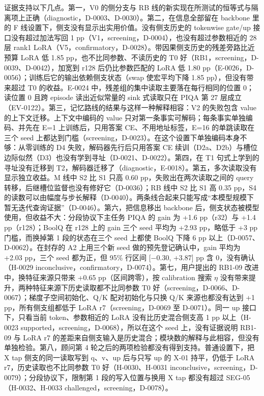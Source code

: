 \documentclass[11pt]{article}
\begin{document}
证据支持以下几点。第一，V0 的侧分支与 RB 线的新实现在所测试的恒等式与隔离项上正确（diagnostic，D-0003、D-0030）。第二，在信息全部留在 backbone 里的 F 线设置下，侧支没有显示出实用价值。没有侧支历史的 tokenwise gate/up 接口没有超过加法写回 1 pp（V1，screening，D-0004），也没有超过参数相近的 28 层 rank1 LoRA（V5，confirmatory，D-0028）。带因果侧支历史的残差旁路比近预算 LoRA 低 1.85 pp，也不比同参数、不读历史的 T0 好（RB1，screening，D-0039、D-0042），加宽到 r128 后仍比参数匹配的 LoRA 低 1.80 pp（E-0026，D-0056）；训练后它的输出依赖侧支状态（swap 使宏平均下降 1.85 pp），但没有带来超过 T0 的收益。E-0024 中，残差组的集中读取主要落在每行相同的位置 0；读位置 0 且跨 episode 读出近似常量的 sink 式读取只在 PIQA 第 27 层成立（EV-0122）。第三，记忆路线的结果与这样一种解释相容：V2 的失败包含 value 的上下文迁移。上下文中编码的 value 只对第一条事实可解码；每条事实单独编码、并先在 E=1 上训练后，只用答案 CE、不用地址标签，E=16 的单跳读取在三个 seed 上都达到门槛（screening，D-0023）。在这个设置下单独编码本身不够：从零训练的 D4 失败，解码器先行后只用答案 CE 续训（D2a、D2b）与槽位边际似然（D3）也没有学到寻址（D-0021、D-0022）。第四，在 T1 句式上学到的寻址没有迁移到 T2，解码器迁移了（diagnostic，E-0018）。第五，多次读取没有显示独立收益。M 线中 S2 比 S1 只高 0.60 pp，失败出在两次读取之间的 query 转移，后继槽位监督也没有修好它（D-0036）；RB 线中 S2 比 S1 高 0.35 pp，S4 的读数可以由幅度与步长解释（D-0040）。两条线合起来只能写成``本模型规模下暂无迭代查询证据''（D-0046）。第六，把信息移出 backbone 后，侧支状态被模型使用，但收益不大：分段协议下主任务 PIQA 的 gain 为 +1.6 pp（r32）与 +1.4 pp（r128）；BoolQ 在 r128 上的 gain 三个 seed 平均为 +2.93 pp，略低于 +3 pp 门槛，而换掉第 1 段的状态在三个 seed 上都使 BoolQ 下降 6 pp 以上（D-0057、D-0062）。在封存的 A2 上用三个新 seed 做的预先登记确认中，gain 平均为 +2.03 pp，三个 seed 都为正，但 95\% 行区间 [$-$0.30, +3.87] pp 含 0，没有确认（H-0029 inconclusive，confirmatory，D-0074）。第七，用户提出的 RB1-09 改进中，换特征来源只带来 +0.65 pp（区间跨零），按 calibration 搜索 $\eta$ 没有带来提升，两种特征来源下历史读取都不比同参数 T0 好（screening，D-0066、D-0067）；梯度子空间初始化、Q/K 配对初始化与只换 Q/K 来源也都没有达到 +1 pp，所有侧支组都低于 LoRA r7（screening，D-0069 至 D-0071）。同一 up 接口下，只看当前 token、参数相近的 LoRA 没有比历史混合侧支高 1 pp 以上（H-0023 supported，screening，D-0068），所以在这个 seed 上，没有证据说明 RB1-09 与 LoRA r7 的差距来自侧支输入是历史混合；模块数的解释与此相容，但没有单独检验。第八，顾问第 4 轮之后的两项检验都没有得到支持。普通设置下，把 X tap 侧支的同一读取写到 q、v、up 后与只写 up 的 X-01 持平，仍低于 LoRA r7，历史读取也不比同参数 T0 好（H-0030、H-0031 inconclusive，screening，D-0079）；分段协议下，限制第 1 段的写入位置与换用 X tap 都没有超过 SEG-05（H-0032、H-0033 challenged，screening，D-0078）。
\end{document}

